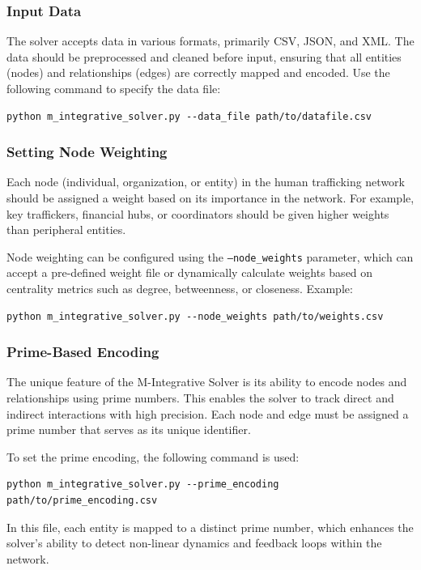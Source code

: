 \documentclass[%
 preprint, linenumbers,
 amsmath,amssymb,
 aps, physrev,
]{revtex4-2}
\begin{document}
\subsubsection{Input Data}
The solver accepts data in various formats, primarily CSV, JSON, and XML. The data should be preprocessed and cleaned before input, ensuring that all entities (nodes) and relationships (edges) are correctly mapped and encoded. Use the following command to specify the data file:
\begin{verbatim}
python m_integrative_solver.py --data_file path/to/datafile.csv
\end{verbatim}

\subsubsection{Setting Node Weighting}
Each node (individual, organization, or entity) in the human trafficking network should be assigned a weight based on its importance in the network. For example, key traffickers, financial hubs, or coordinators should be given higher weights than peripheral entities.

Node weighting can be configured using the \texttt{--node_weights} parameter, which can accept a pre-defined weight file or dynamically calculate weights based on centrality metrics such as degree, betweenness, or closeness. Example:
\begin{verbatim}
python m_integrative_solver.py --node_weights path/to/weights.csv
\end{verbatim}

\subsubsection{Prime-Based Encoding}
The unique feature of the M-Integrative Solver is its ability to encode nodes and relationships using prime numbers. This enables the solver to track direct and indirect interactions with high precision. Each node and edge must be assigned a prime number that serves as its unique identifier.

To set the prime encoding, the following command is used:
\begin{verbatim}
python m_integrative_solver.py --prime_encoding path/to/prime_encoding.csv
\end{verbatim}

In this file, each entity is mapped to a distinct prime number, which enhances the solver’s ability to detect non-linear dynamics and feedback loops within the network.
\end{document}
